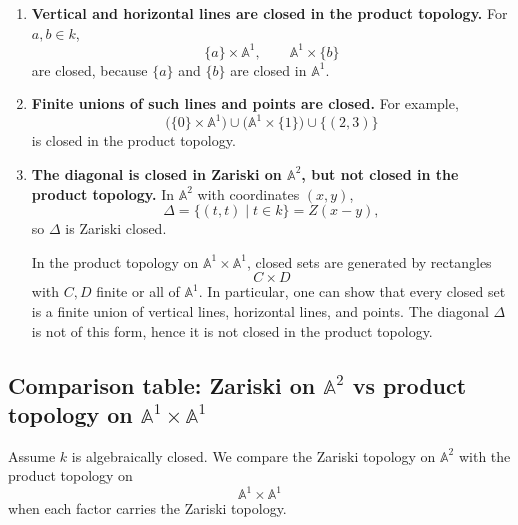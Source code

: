 \documentclass[12pt,a4paper]{article}
\theoremstyle{plain}
\theoremstyle{definition}      %
\begin{document}
\begin{enumerate}
	\item \textbf{Vertical and horizontal lines are closed in the product topology.}
	For $a,b\in k$,
	\[
	\{a\}\times \mathbb A^1,
	\qquad
	\mathbb A^1\times \{b\}
	\]
	are closed, because $\{a\}$ and $\{b\}$ are closed in $\mathbb A^1$.
	
	\item \textbf{Finite unions of such lines and points are closed.}
	For example,
	\[
	\bigl(\{0\}\times \mathbb A^1\bigr)
	\cup
	\bigl(\mathbb A^1\times\{1\}\bigr)
	\cup
	\{(2,3)\}
	\]
	is closed in the product topology.
	
	\item \textbf{The diagonal is closed in Zariski on $\mathbb A^2$, but not closed in the product topology.}
	In $\mathbb A^2$ with coordinates $(x,y)$,
	\[
	\Delta
	=
	\{(t,t)\mid t\in k\}
	=
	Z(x-y),
	\]
	so $\Delta$ is Zariski closed.
	
	In the product topology on $\mathbb A^1\times \mathbb A^1$, closed sets are generated by rectangles
	\[
	C\times D
	\]
	with $C,D$ finite or all of $\mathbb A^1$.
	In particular, one can show that every closed set is a finite union of vertical lines, horizontal lines, and points.
	The diagonal $\Delta$ is not of this form, hence it is not closed in the product topology.
\end{enumerate}

\subsection*{Comparison table: Zariski on $\mathbb A^2$ vs product topology on $\mathbb A^1\times \mathbb A^1$}

Assume $k$ is algebraically closed.
We compare the Zariski topology on $\mathbb A^2$ with the product topology on
\[
\mathbb A^1\times \mathbb A^1
\]
when each factor carries the Zariski topology.
\end{document}
